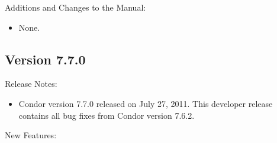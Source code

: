 \noindent Additions and Changes to the Manual:

\begin{itemize}

\item None.

\end{itemize}


\subsection*{\label{sec:New-7-7-0}Version 7.7.0}

\noindent Release Notes:

\begin{itemize}

\item Condor version 7.7.0 released on July 27, 2011.
This developer release contains all bug fixes from Condor version 7.6.2.

\end{itemize}


\noindent New Features:

